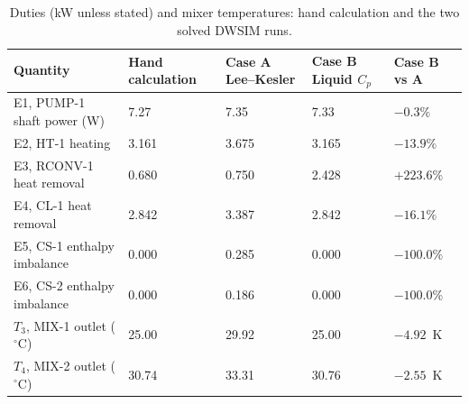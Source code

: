 \documentclass[10pt,a4paper]{article}
\newcommand{\hdrrow}{}
\begin{document}
\begin{table}[H]
\centering
\caption{Duties (kW unless stated) and mixer temperatures: hand calculation and the two solved DWSIM runs.}
\label{tab:duties}
\small
\begin{tabularx}{\textwidth}{|Y|R{2.1cm}|R{2.1cm}|R{2.1cm}|R{1.9cm}|}
\hline
\hdrrow
\textbf{Quantity} & \textbf{Hand calculation} & \textbf{Case A Lee--Kesler} & \textbf{Case B Liquid $C_p$} & \textbf{Case B vs A} \\
\hline
E1, PUMP-1 shaft power (W) & 7.27 & 7.35 & 7.33 & $-0.3\%$ \\
\hline
E2, HT-1 heating & 3.161 & 3.675 & 3.165 & $-13.9\%$ \\
\hline
E3, RCONV-1 heat removal & 0.680 & 0.750 & 2.428 & $+223.6\%$ \\
\hline
E4, CL-1 heat removal & 2.842 & 3.387 & 2.842 & $-16.1\%$ \\
\hline
E5, CS-1 enthalpy imbalance & 0.000 & 0.285 & 0.000 & $-100.0\%$ \\
\hline
E6, CS-2 enthalpy imbalance & 0.000 & 0.186 & 0.000 & $-100.0\%$ \\
\hline
$T_3$, MIX-1 outlet ($^\circ$C) & 25.00 & 29.92 & 25.00 & $-4.92$~K \\
\hline
$T_4$, MIX-2 outlet ($^\circ$C) & 30.74 & 33.31 & 30.76 & $-2.55$~K \\
\hline
\end{tabularx}
\end{table}
\end{document}
